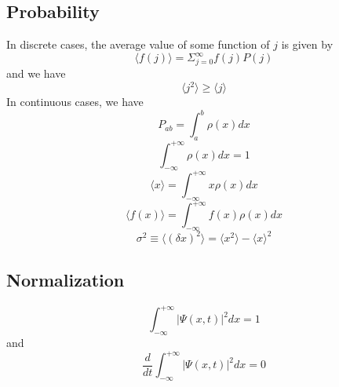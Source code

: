 \documentclass{article}
\numberwithin{equation}{section}
\begin{document}
\subsection{Probability}
In discrete cases, the average value of some function of $j$ is given by
\begin{equation}
	\langle f(j) \rangle=\Sigma_{j=0}^\infty f(j)P(j)
\end{equation}
and we have
\begin{equation}
	\langle j^2\rangle \geq \langle j\rangle
\end{equation}
In continuous cases, we have
\begin{equation}
	P_{ab}=\int_a^b\rho(x)dx
\end{equation}
\begin{equation}
	\int_{-\infty}^{+\infty}\rho(x)dx=1
\end{equation}\begin{equation}
	\langle x\rangle=\int_{-\infty}^{+\infty}x\rho(x)dx
\end{equation}\begin{equation}
	\langle f(x) \rangle=\int_{-\infty}^{+\infty} f(x)\rho(x)dx
\end{equation}\begin{equation}
	\sigma^2 \equiv\langle(\delta x)^2\rangle=\langle x^2\rangle-\langle x\rangle^2
\end{equation}
\subsection{Normalization}
\begin{equation}
	\int_{-\infty}^{+\infty}|\Psi(x,t)|^2dx=1
\end{equation}
and
\begin{equation}
	\frac{d}{dt}\int_{-\infty}^{+\infty}|\Psi(x,t)|^2dx=0
\end{equation}
\end{document}
